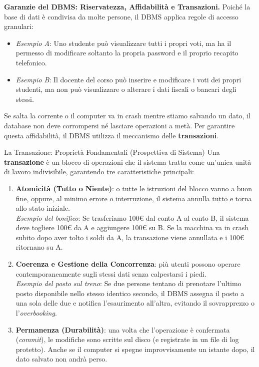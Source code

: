 \documentclass[12pt]{extarticle}
\begin{document}
\medskip
\noindent \textbf{Garanzie del DBMS: Riservatezza, Affidabilità e Transazioni.} Poiché la base di dati è condivisa da molte persone, il DBMS applica regole di accesso granulari:
\begin{itemize}
    \item \textit{Esempio A}: Uno studente può visualizzare tutti i propri voti, ma ha il permesso di modificare soltanto la propria password e il proprio recapito telefonico.
    \item \textit{Esempio B}: Il docente del corso può inserire e modificare i voti dei propri studenti, ma non può visualizzare o alterare i dati fiscali o bancari degli stessi.
\end{itemize}
\noindent Se salta la corrente o il computer va in crash mentre stiamo salvando un dato, il database non deve corrompersi né lasciare operazioni a metà. Per garantire questa affidabilità, il DBMS utilizza il meccanismo delle \textbf{transazioni}.

\begin{cbox}{La Transazione: Proprietà Fondamentali (Prospettiva di Sistema)}
\noindent Una \textbf{transazione} è un blocco di operazioni che il sistema tratta come un'unica unità di lavoro indivisibile, garantendo tre caratteristiche principali:
\begin{enumerate}
    \item \textbf{Atomicità (Tutto o Niente)}: o tutte le istruzioni del blocco vanno a buon fine, oppure, al minimo errore o interruzione, il sistema annulla tutto e torna allo stato iniziale. \\
    \textit{Esempio del bonifico}: Se trasferiamo 100€ dal conto A al conto B, il sistema deve togliere 100€ da A e aggiungere 100€ su B. Se la macchina va in crash subito dopo aver tolto i soldi da A, la transazione viene annullata e i 100€ ritornano su A.
    \item \textbf{Coerenza e Gestione della Concorrenza}: più utenti possono operare contemporaneamente sugli stessi dati senza calpestarsi i piedi. \\
    \textit{Esempio del posto sul treno}: Se due persone tentano di prenotare l'ultimo posto disponibile nello stesso identico secondo, il DBMS assegna il posto a una sola delle due e notifica l'esaurimento all'altra, evitando il sovrapprezzo o l'\textit{overbooking}.
    \item \textbf{Permanenza (Durabilità)}: una volta che l'operazione è confermata (\textit{commit}), le modifiche sono scritte sul disco (e registrate in un file di log protetto). Anche se il computer si spegne improvvisamente un istante dopo, il dato salvato non andrà perso.
\end{enumerate}
\end{cbox}
\end{document}
